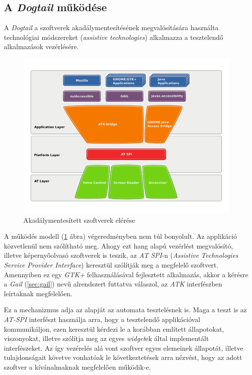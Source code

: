 \subsection{A \textit{Dogtail} működése}

A \textit{Dogtail} a szoftverek akadálymentesítésének megvalósítására használta technológiai módszereket (\textit{assistive technologies}) alkalmazza a tesztelendő alkalmazások vezérlésére.

\begin{figure}[h]
\begin{center}
\includegraphics[height=0.45\linewidth]{images/a11y.png}
\caption{Akadálymentesített szoftverek elérése}
\label{fig:a11y}
\end{center}
\end{figure}

A működés modell (\ref{fig:a11y} ábra) végeredményben nem túl bonyolult. Az applikáció közvetlenül nem szólítható meg. Ahogy ezt hang alapú vezérlést megvalósító, illetve képernyőolvasó szoftverek is teszik, az \textit{AT SPI}-n (\textit{Assistive Technologies Service Provider Interface}) keresztül szólítják meg a megfelelő szoftvert. Amennyiben ez egy \textit{GTK+} felhasználásával fejlesztett alkalmazás, akkor a kérésre a \textit{Gail} (\ref{sec:gail}) nevű alrendszert futtatva válaszol, az \textit{ATK} interfészben leírtaknak megfelelően. 

Ez a mechanizmus adja az alapját az automata tesztelésnek is. Maga a teszt is az \textit{AT-SPI} interfészt használja arra, hogy a tesztelendő applikációval kommunikáljon, ezen keresztül kérdezi le a korábban említett állapotokat, viszonyokat, illetve szólítja meg az egyes \textit{widget}ek által implementált interfészeket. Az így vezérelés alá vont szoftver egyes elemeinek állapotát, illetve tulajdonságait követve vonhatóak le következtetések arra nézvést, hogy az adott szoftver a kívánalmaknak megfelelően működik-e.
